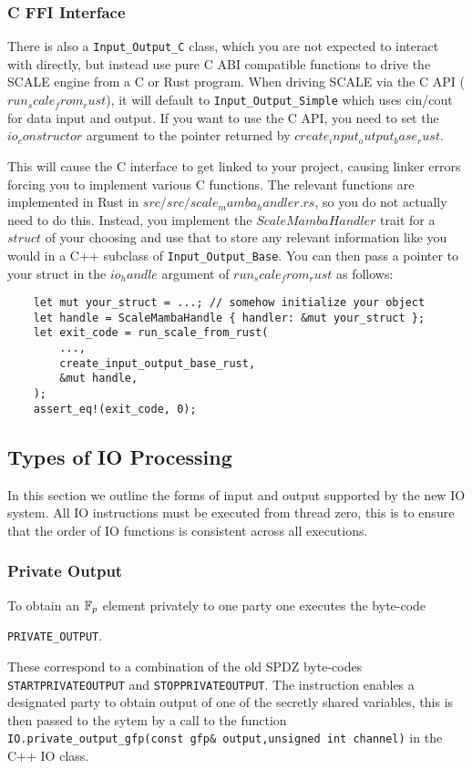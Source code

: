 \subsubsection{C FFI Interface}
There is also a \verb|Input_Output_C| class, which you are
not expected to interact with directly, but instead use pure
C ABI compatible functions to drive the SCALE engine from a
C or Rust program. When driving SCALE via the C API ($run_scale_from_rust$), it will
default to \verb|Input_Output_Simple| which uses cin/cout for
data input and output. If you want to use the C API, you need
to set the $io_constructor$ argument to the pointer returned
by $create_input_output_base_rust$.

This will cause the C interface to get linked to your project,
causing linker errors forcing you to implement various C functions.
The relevant functions are implemented in Rust in $src/src/scale_mamba_handler.rs$,
so you do not actually need to do this. Instead, you implement the
$ScaleMambaHandler$ trait for a $struct$ of your choosing and
use that to store any relevant information like you would in a
C++ subclass of \verb|Input_Output_Base|. You can then pass a pointer
to your struct in the $io_handle$ argument of $run_scale_from_rust$ as
follows:

\begin{verbatim}
    let mut your_struct = ...; // somehow initialize your object
    let handle = ScaleMambaHandle { handler: &mut your_struct };
    let exit_code = run_scale_from_rust(
        ...,
        create_input_output_base_rust,
        &mut handle,
    );
    assert_eq!(exit_code, 0);
\end{verbatim}

\subsection{Types of IO Processing}
In this section we outline the forms of input and
output supported by the new IO system.
All IO instructions must be executed from thread zero, this is
to ensure that the order of IO functions is consistent across
all executions.

\subsubsection{Private Output}
To obtain an ${\mathbb{F}}_p$ element privately to one party one
executes the byte-code
\begin{center}
    \verb+PRIVATE_OUTPUT+.
\end{center}
These correspond to a combination of the old SPDZ byte-codes
\verb+STARTPRIVATEOUTPUT+ and \verb+STOPPRIVATEOUTPUT+.
The instruction enables a designated party to obtain output of
one of the secretly shared variables, this is then passed
to the sytem by a call to the function
\verb+IO.private_output_gfp(const gfp& output,unsigned int channel)+ in the C++ IO class.


